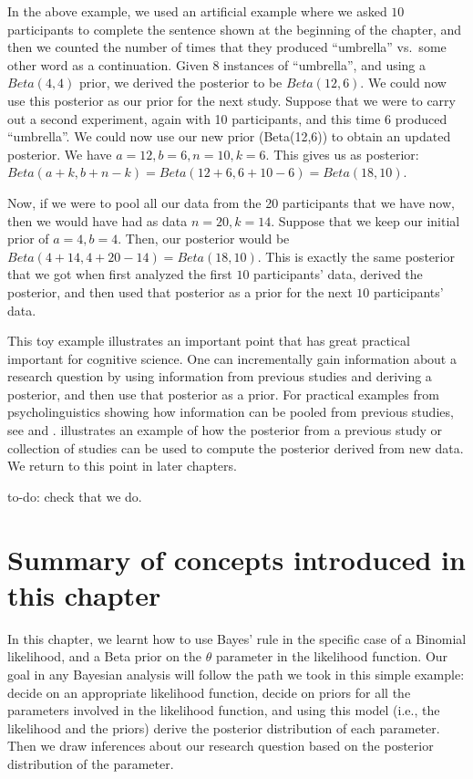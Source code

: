 \documentclass[12pt,]{krantz}
\let\BeginKnitrBlock\begin \let\EndKnitrBlock\end
\begin{document}
In the above example, we used an artificial example where we asked \(10\) participants to complete the sentence shown at the beginning of the chapter, and then we counted the number of times that they produced ``umbrella'' vs.~some other word as a continuation. Given 8 instances of ``umbrella'', and using a \(Beta(4,4)\) prior, we derived the posterior to be \(Beta(12,6)\). We could now use this posterior as our prior for the next study. Suppose that we were to carry out a second experiment, again with 10 participants, and this time \(6\) produced ``umbrella''. We could now use our new prior (Beta(12,6)) to obtain an updated posterior. We have \(a=12, b=6, n=10, k=6\). This gives us as posterior:
\(Beta(a+k,b+n-k) = Beta(12+6,6+10-6)=Beta(18,10)\).

Now, if we were to pool all our data from the 20 participants that we have now, then we would have had as data \(n=20, k=14\). Suppose that we keep our initial prior of \(a=4,b=4\). Then, our posterior would be \(Beta(4+14,4+20-14)=Beta(18,10)\). This is exactly the same posterior that we got when first analyzed the first \(10\) participants' data, derived the posterior, and then used that posterior as a prior for the next \(10\) participants' data.

This toy example illustrates an important point that has great practical important for cognitive science. One can incrementally gain information about a research question by using information from previous studies and deriving a posterior, and then use that posterior as a prior. For practical examples from psycholinguistics showing how information can be pooled from previous studies, see \citet{JaegerEngelmannVasishth2017} and \citet{NicenboimRoettgeretal}. \citet{VasishthEngelmann2020} illustrates an example of how the posterior from a previous study or collection of studies can be used to compute the posterior derived from new data. We return to this point in later chapters.

\BeginKnitrBlock{rmdnote}
to-do: check that we do.
\EndKnitrBlock{rmdnote}

\hypertarget{summary-of-concepts-introduced-in-this-chapter-1}{%
\section{Summary of concepts introduced in this chapter}\label{summary-of-concepts-introduced-in-this-chapter-1}}

In this chapter, we learnt how to use Bayes' rule in the specific case of a Binomial likelihood, and a Beta prior on the \(\theta\) parameter in the likelihood function. Our goal in any Bayesian analysis will follow the path we took in this simple example: decide on an appropriate likelihood function, decide on priors for all the parameters involved in the likelihood function, and using this model (i.e., the likelihood and the priors) derive the posterior distribution of each parameter. Then we draw inferences about our research question based on the posterior distribution of the parameter.
\end{document}
